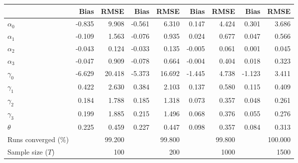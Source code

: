 
\begin{tabular}[t]{lrrrrrrrr}
\toprule
  & Bias & RMSE & Bias & RMSE & Bias & RMSE & Bias & RMSE\\
\midrule
$\alpha_{0}$ & -0.835 & 9.908 & -0.561 & 6.310 & 0.147 & 4.424 & 0.301 & 3.686\\
$\alpha_{1}$ & -0.109 & 1.563 & -0.076 & 0.935 & 0.024 & 0.677 & 0.047 & 0.566\\
$\alpha_{2}$ & -0.043 & 0.124 & -0.033 & 0.135 & -0.005 & 0.061 & 0.001 & 0.045\\
$\alpha_{3}$ & -0.047 & 0.909 & -0.078 & 0.664 & -0.004 & 0.404 & 0.018 & 0.323\\
$\gamma_{0}$ & -6.629 & 20.418 & -5.373 & 16.692 & -1.445 & 4.738 & -1.123 & 3.411\\
$\gamma_{1}$ & 0.422 & 2.630 & 0.384 & 2.103 & 0.137 & 0.580 & 0.115 & 0.409\\
$\gamma_{2}$ & 0.184 & 1.788 & 0.185 & 1.318 & 0.073 & 0.357 & 0.048 & 0.261\\
$\gamma_{3}$ & 0.199 & 1.885 & 0.215 & 1.496 & 0.068 & 0.376 & 0.055 & 0.276\\
$\theta$ & 0.225 & 0.459 & 0.227 & 0.447 & 0.098 & 0.357 & 0.084 & 0.313\\
Runs converged (\%) &  & 99.200 &  & 99.800 &  & 99.800 &  & 100.000\\
Sample size ($T$) &  & 100 &  & 200 &  & 1000 &  & 1500\\
\bottomrule
\end{tabular}
